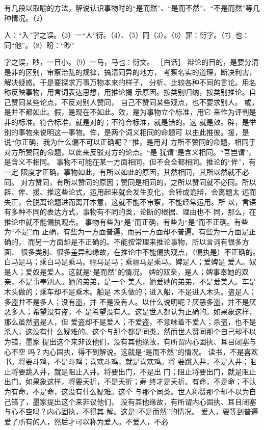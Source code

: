 \documentclass[12pt,UTF8]{ctexbook}
\begin{document}
有几段以取喻的方法，解说认识事物时的“是而然”、“是而不然”、“不是而然”等几种情况。（2） 

人：“入”字之误。（3）一“人”衍。（4）、（5）同（3）。（6）罪：衍字。（7）也：同“他”。（8）盼：“眇” 

字之误，眇，一目小。（9）一马，马也：衍文。 
［白话］ 
辩论的目的，是要分清是非的区别，审察治乱的规律，搞清同异的地方， 
考察名实的道理，断决利害，解决疑惑。于是要探求万事万物本来的样子， 
分析、比较各种不同的言论。用名称反映事物，用言词表达思想，用推论揭 
示原因。按类别归纳，按类别推论。自己赞同某些论点，不反对别人赞同， 
自己不赞同某些观点，也不要求别人。 
或，是并不都如此。假，是现在不如此。效，是为事物立个标准，用它 
来作为评判是非的标准。符合标准，就是对的；不符合标准，就是错的。这 
就是效。辟，是举别的事物来说明这一事物。侔，是两个词义相同的命题可 
以由此推彼。援，是说“你正确，我为什么偏不可以正确呢？”推，是用对 
方所不赞同的命题，相同于对方所赞同的命题，以此来反驳对方的论点。“是 
犹谓”是含义相同。“吾岂谓”，是含义不相同。 
事物不可能在某一方面相同，但不会全都相同。推论的“侔”，有一定 
限度才正确。事物如此，有所以如此的原因，其然相同，其所以然就不必同。 
对方赞同，有所以赞同的原因；赞同是相同的，之所以赞同就不必同。所以 
辟、侔、援、推这些论式，运用起来就会发生变化，会转成诡辩，会离题太 
远而失正，会脱离论题进而离开本意，这就不能不审察，不能经常运用。所 
以，言语有多种不同的表达方式，事物有不同的类，论断的根据、理由也不 
同，那么，在推论中就不能偏执观点。 
事物有些为“是”而正确，有些为“是”而不正确。有些为“不是”而 
正确，有些为一方面普遍，而另一方面却不普遍。有些为一方面是正确的， 
而另一方面却是不正确的。不能按常理来推论事物，所以言词有很多方面、 
很多类别、很多差异和缘故，在推论中不能偏执观点，（偏执是）不正确的。 
白马是马；乘白马是乘马。骊马是马；乘骊马是乘马。婢是人；爱婢是 
爱人。奴是人；爱奴是爱人。这就是“是而然”的情况。 
婢的双亲，是人；婢事奉她的双亲，不是事奉别人。她的弟弟，是一个 
美人，她爱她的弟弟，不是爱美人。车是木头做的；乘车却不是乘木。船是 
木头做的；进入船，不是进入木头。盗是人；多盗并不是多人；没有盗，并 
不是没有人。以什么说明呢？厌恶多盗，并不是厌恶多人；希望没有盗，不 
是希望没有人。这是世人都认为正确的。如果象这样，那么虽然盗是人，但 
爱盗却不是爱人；不爱盗，不意味着不爱人；杀盗，也不是杀人，这没有什 
么疑难的。这个与那个都是同类。然而世人赞同那个自己却不以为错，墨家 
提出这个来非议他们，没有其他缘故，有所谓内心固执、耳目闭塞与心不空 
吗？内心固执，得不到解说。这就是“是而不然”的情况。 
读书，不是喜欢书。将要斗鸡，不是斗鸡；喜欢斗鸡，就是喜欢鸡。将 
要跳入井，不是入井；阻止将要跳入井，就是阻止入井。将要出门，不是出 
门；阻止将要出门，就是阻止出门。如果象这样，将要夭折，不是夭折；寿 
终才是夭折。有命，不是命；不认为有命，不是命，这没有什么疑难。这个 
与那个同类。世人称赞那个却不以为自己错了，墨家提出这个来非议他们， 
没有其他缘故，有所谓内心固执、耳目闭塞与心不空吗？内心固执，不得其 
解。这是“不是而然”的情况。 
爱人，要等到普遍爱了所有的人，然后才可以称为爱人。不爱人，不必 
\end{document}
